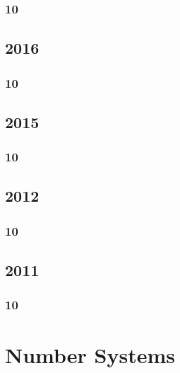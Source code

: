 \documentclass[11pt]{book}
\begin{document}
\subsection{10}




\section{2016}
\subsection{10}

\section{2015}
\subsection{10}


%
\section{2012}
\subsection{10}

\section{2011}
\subsection{10}

%

\chapter{Number Systems}
\end{document}
